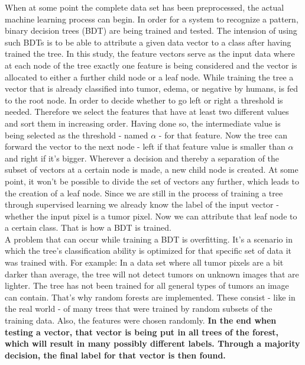 \documentclass{article}
\begin{document}
 When at some point the complete data set has been preprocessed, the actual machine learning process can begin. In order for a system to recognize a pattern, binary decision trees (BDT) are being trained and tested. The intension of using such BDTs is to be able to attribute a given data vector to a class after having trained the tree. In this study, the feature vectors serve as the input data where at each node of the tree exactly one feature is being considered and the vector is allocated to either a further child node or a leaf node. While training the tree a vector that is already classified into tumor, edema, or negative by humans, is fed to the root node. In order to decide whether to go left or right a threshold is needed. Therefore we select the features that have at least two different values and sort them in increasing order. Having done so, the intermediate value is being selected as the threshold - named $\alpha $ - for that feature. Now the tree can forward the vector to the next node - left if that feature value is smaller than $\alpha $ and right if it's bigger. Wherever a decision and thereby a separation of the subset of vectors at a certain node is made, a new child node is created. At some point, it won't be possible to divide the set of vectors any further, which leads to the creation of a leaf node. Since we are still in the process of training a tree through supervised learning we already know the label of the input vector - whether the input pixel is a tumor pixel. Now we can attribute that leaf node to a certain class. That is how a BDT is trained. \\


 A problem that can occur while training a BDT is overfitting. It's a scenario in which the tree's classification ability is optimized for that specific set of data it was trained with. For example: In a data set where all tumor pixels are a bit darker than average, the tree will not detect tumors on unknown images that are lighter. The tree has not been trained for all general types of tumors an image can contain. That's why random forests are implemented. These consist - like in the real world - of many trees that were trained by random subsets of the training data. Also, the features were chosen randomly. \textbf{In the end when testing a vector, that vector is being put in all trees of the forest, which will result in many possibly different labels. Through a majority decision, the final label for that vector is then found.}\\
\end{document}
